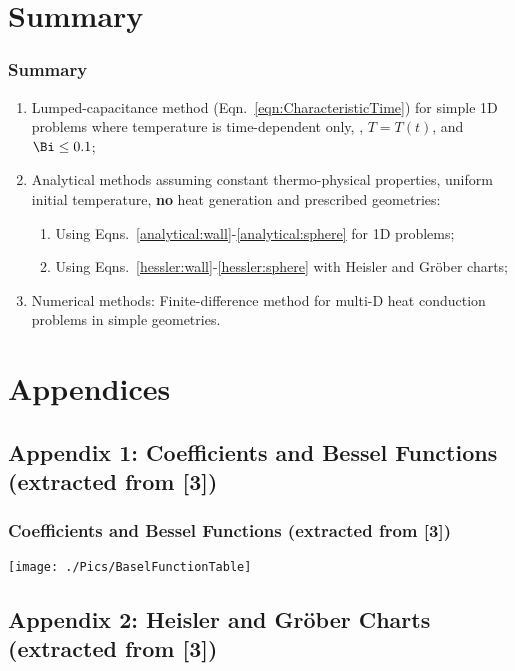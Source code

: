 \documentclass[10pt,compress,handout,ignorenonframetext,unknownkeysallowed]{beamer}
\begin{document}
\section{Summary} 


\begin{frame}
  \frametitle{Summary}
    \begin{enumerate}  
       \item Lumped-capacitance method (Eqn.~\ref{eqn:CharacteristicTime}) for simple 1D problems where temperature is time-dependent only, \ie , $T=T(t)$, and $\Bi \leq 0.1$;  
       \item Analytical methods assuming constant thermo-physical properties, uniform initial temperature, {\bf no} heat generation and prescribed geometries:
           \begin{enumerate}
              \item Using Eqns.~\ref{analytical:wall}-\ref{analytical:sphere} for 1D problems;
              \item Using Eqns.~\ref{hessler:wall}-\ref{hessler:sphere} with Heisler and Gr\"ober charts;
            \end{enumerate}
       \item Numerical methods: Finite-difference method for multi-D heat conduction problems in simple geometries.
    \end{enumerate}
\end{frame}


\section{Appendices}

\subsection{Appendix 1: Coefficients and Bessel Functions (extracted from [3])}\label{appendix1}
\begin{frame}
 \frametitle{Coefficients and Bessel Functions (extracted from [3])}
        \begin{center}
          \texttt{[image: ./Pics/BaselFunctionTable]}
        \end{center}
\end{frame}


\subsection{Appendix 2: Heisler and Gr\"ober Charts (extracted from [3])}\label{appendix2}
{
  
}
\end{document}
